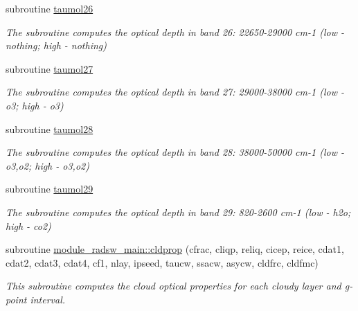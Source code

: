 \begin{DoxyCompactItemize}
\mbox{\label{radsw__main_8f_a20261640145a5d10e091ef3c67763175}} 
subroutine \hyperlink{radsw__main_8f_a20261640145a5d10e091ef3c67763175}{taumol26}
\begin{DoxyCompactList}\small\item\em The subroutine computes the optical depth in band 26\+: 22650-\/29000 cm-\/1 (low -\/ nothing; high -\/ nothing) \end{DoxyCompactList}\item 
\mbox{\label{radsw__main_8f_a7d2cea6cc0cfde853d25a14ba0efcca2}} 
subroutine \hyperlink{radsw__main_8f_a7d2cea6cc0cfde853d25a14ba0efcca2}{taumol27}
\begin{DoxyCompactList}\small\item\em The subroutine computes the optical depth in band 27\+: 29000-\/38000 cm-\/1 (low -\/ o3; high -\/ o3) \end{DoxyCompactList}\item 
\mbox{\label{radsw__main_8f_a2113c76707f43cf91fe5926ab69d1b8b}} 
subroutine \hyperlink{radsw__main_8f_a2113c76707f43cf91fe5926ab69d1b8b}{taumol28}
\begin{DoxyCompactList}\small\item\em The subroutine computes the optical depth in band 28\+: 38000-\/50000 cm-\/1 (low -\/ o3,o2; high -\/ o3,o2) \end{DoxyCompactList}\item 
\mbox{\label{radsw__main_8f_a08e2db10432d07392f29a49bc5b5c640}} 
subroutine \hyperlink{radsw__main_8f_a08e2db10432d07392f29a49bc5b5c640}{taumol29}
\begin{DoxyCompactList}\small\item\em The subroutine computes the optical depth in band 29\+: 820-\/2600 cm-\/1 (low -\/ h2o; high -\/ co2) \end{DoxyCompactList}\end{DoxyCompactItemize}
\textbf{ }\par
\begin{DoxyCompactItemize}
\item 
subroutine \hyperlink{group__module__radsw__main_ga89ca572fa54a63a21009caa0760d405b}{module\+\_\+radsw\+\_\+main\+::cldprop} (cfrac, cliqp, reliq, cicep, reice, cdat1, cdat2, cdat3, cdat4, cf1, nlay, ipseed, taucw, ssacw, asycw, cldfrc, cldfmc)
\begin{DoxyCompactList}\small\item\em This subroutine computes the cloud optical properties for each cloudy layer and g-\/point interval. \end{DoxyCompactList}\end{DoxyCompactItemize}

